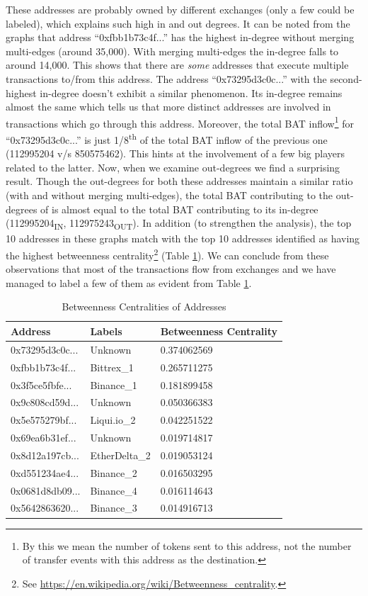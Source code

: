\documentclass[sigconf]{acmart}
\begin{document}
These addresses are probably owned by different exchanges (only a few could be labeled), which explains such high in and out degrees.
It can be noted from the graphs that address ``0xfbb1b73c4f...''
has the highest in-degree without merging multi-edges (around 35,000).
With merging multi-edges the in-degree falls to around 14,000.
This shows that there are \emph{some} addresses that
execute multiple transactions to/from this address.
The address ``0x73295d3c0c...'' with the second-highest in-degree
doesn't exhibit a similar phenomenon.
Its in-degree remains almost the same which tells us that more
distinct addresses are involved in transactions which go through
this address.
Moreover, the total BAT inflow\footnote{By this we mean the number of tokens sent to this address, not the number of transfer events with this address as the destination.}
for ``0x73295d3c0c...''
is just 1/8\textsuperscript{th} of the total BAT inflow of the previous
one (112995204 v/s 850575462).
This hints at the involvement of a few big players related to the latter.
Now, when we examine out-degrees we find a surprising result.
Though the out-degrees for both these addresses
maintain a similar ratio (with and without merging multi-edges),
the total BAT contributing to the out-degrees of is almost equal
to the total BAT contributing to its in-degree
(112995204\textsubscript{IN}, 112975243\textsubscript{OUT}). 
In addition (to strengthen the analysis),
the top 10 addresses in these graphs match with the top 10 addresses
identified as having the highest betweenness centrality\footnote{See \url{https://en.wikipedia.org/wiki/Betweenness_centrality}.} (Table \ref{tab:tweencent}). We can conclude from these observations that most of the transactions flow from exchanges and we have managed to label a few of them as evident from Table \ref{tab:tweencent}.

\begin{table}[]
\begin{tabular}{|lll|}%
\hline
\bfseries Address & \bfseries Labels & \bfseries Betweenness Centrality\\%
\hline
0x73295d3c0c...&Unknown&0.374062569\\
0xfbb1b73c4f...&Bittrex\_1&0.265711275\\
0x3f5ce5fbfe...&Binance\_1&0.181899458\\
0x9c808cd59d...&Unknown&0.050366383\\
0x5e575279bf...&Liqui.io\_2&0.042251522\\
0x69ea6b31ef...&Unknown&0.019714817\\
0x8d12a197cb...&EtherDelta\_2\footnotemark&0.019053124\\
0xd551234ae4...&Binance\_2&0.016503295\\
0x0681d8db09...&Binance\_4&0.016114643\\
0x5642863620...&Binance\_3&0.014916713\\
\hline
\end{tabular}
\caption{Betweenness Centralities of Addresses}
\label{tab:tweencent}
\end{table}
\end{document}
